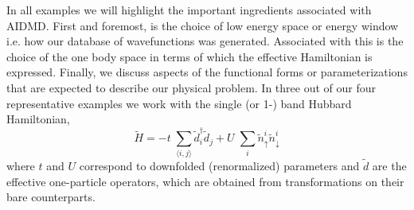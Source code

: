   
In all examples we will highlight the important ingredients associated with AIDMD. First and foremost, is the choice 
of low energy space or energy window i.e. how our database of wavefunctions was generated. Associated with this is 
the choice of the one body space in terms of which the effective Hamiltonian is expressed. Finally, we discuss 
aspects of the functional forms or parameterizations that are expected to describe our physical 
problem. In three out of our four representative examples we work with the single (or 1-) band Hubbard Hamiltonian,
\begin{equation}
	\tilde{H} = -t \;\sum_{\langle i,j \rangle} \tilde{d}_i^{\dagger} \tilde{d}_j + U \;\sum_{i} \tilde{n}^{i}_{\uparrow} \tilde{n}^{i}_{\downarrow}
\label{eq:oneband}
\end{equation}
where $t$ and $U$ correspond to downfolded (renormalized) parameters and $\tilde{d}$ are the effective one-particle operators, 
which are obtained from transformations on their bare counterparts. 

